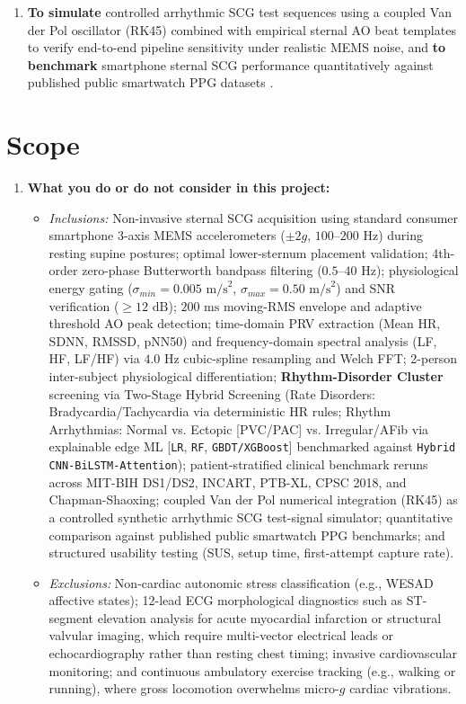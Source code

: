 \begin{enumerate}
	\item \textbf{To simulate} controlled arrhythmic SCG test sequences using a coupled Van der Pol oscillator (RK45) combined with empirical sternal AO beat templates to verify end-to-end pipeline sensitivity under realistic MEMS noise, and \textbf{to benchmark} smartphone sternal SCG performance quantitatively against published public smartwatch PPG datasets \cite{bent2020investigating, nelson2019accuracy, perez2019large, lubitz2022detection}.
\end{enumerate}

\section{Scope}
\begin{enumerate}
	\item \textbf{What you do or do not consider in this project:}
	\begin{itemize}
		\item \textit{Inclusions:} Non-invasive sternal SCG acquisition using standard consumer smartphone 3-axis MEMS accelerometers ($\pm 2g$, $100\text{--}200\text{ Hz}$) during resting supine postures; optimal lower-sternum placement validation; 4th-order zero-phase Butterworth bandpass filtering ($0.5\text{--}40\text{ Hz}$); physiological energy gating ($\sigma_{min} = 0.005\text{ m/s}^2$, $\sigma_{max} = 0.50\text{ m/s}^2$) and SNR verification ($\ge 12\text{ dB}$); $200\text{ ms}$ moving-RMS envelope and adaptive threshold AO peak detection; time-domain PRV extraction (Mean HR, SDNN, RMSSD, pNN50) and frequency-domain spectral analysis (LF, HF, LF/HF) via $4.0\text{ Hz}$ cubic-spline resampling and Welch FFT; 2-person inter-subject physiological differentiation; \textbf{Rhythm-Disorder Cluster} screening via Two-Stage Hybrid Screening (Rate Disorders: Bradycardia/Tachycardia via deterministic HR rules; Rhythm Arrhythmias: Normal vs. Ectopic [PVC/PAC] vs. Irregular/AFib via explainable edge ML [\texttt{LR}, \texttt{RF}, \texttt{GBDT/XGBoost}] benchmarked against \texttt{Hybrid CNN-BiLSTM-Attention}); patient-stratified clinical benchmark reruns across MIT-BIH DS1/DS2, INCART, PTB-XL, CPSC 2018, and Chapman-Shaoxing; coupled Van der Pol numerical integration (RK45) as a controlled synthetic arrhythmic SCG test-signal simulator; quantitative comparison against published public smartwatch PPG benchmarks; and structured usability testing (SUS, setup time, first-attempt capture rate).
		\item \textit{Exclusions:} Non-cardiac autonomic stress classification (e.g., WESAD affective states); 12-lead ECG morphological diagnostics such as ST-segment elevation analysis for acute myocardial infarction or structural valvular imaging, which require multi-vector electrical leads or echocardiography rather than resting chest timing; invasive cardiovascular monitoring; and continuous ambulatory exercise tracking (e.g., walking or running), where gross locomotion overwhelms micro-$g$ cardiac vibrations.
	\end{itemize}
	

\end{enumerate}
